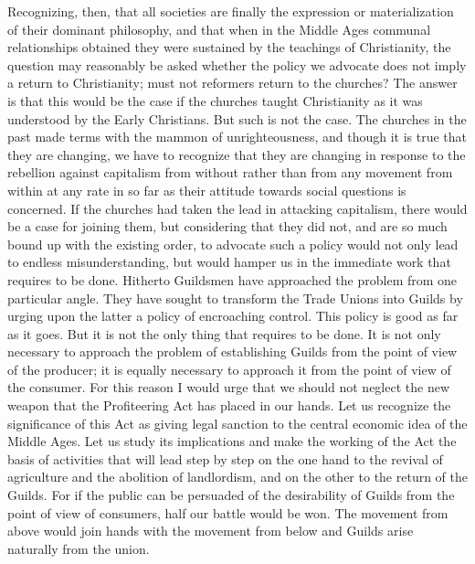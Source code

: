 \documentclass{book}
\begin{document}
Recognizing, then, that all societies are finally the expression or materialization of their dominant philosophy, and that when in the Middle Ages communal relationships obtained they were sustained by the teachings of Christianity, the question may reasonably be asked whether the policy we advocate does not imply a return to Christianity; must not reformers return to the churches? The answer is that this would be the case if the churches taught Christianity as it was understood by the Early Christians. But such is not the case. The churches in the past made terms with the mammon of unrighteousness, and though it is true that they are changing, we have to recognize that they are changing in response to the rebellion against capitalism from without rather than from any movement from within at any rate in so far as their attitude towards social questions is concerned. If the churches had taken the lead in attacking capitalism, there would be a case for joining them, but considering that they did not, and are so much bound up with the existing order, to advocate such a policy would not only lead to endless misunderstanding, but would hamper us in the immediate work that requires to be done. Hitherto Guildsmen have approached the problem from one particular angle. They have sought to transform the Trade Unions into Guilds by urging upon the latter a policy of encroaching control. This policy is good as far as it goes. But it is not the only thing that requires to be done. It is not only necessary to approach the problem of establishing Guilds from the point of view of the producer; it is equally necessary to approach it from the point of view of the consumer. For this reason I would urge that we should not neglect the new weapon that the Profiteering Act has placed in our hands. Let us recognize the significance of this Act as giving legal sanction to the central economic idea of the Middle Ages. Let us study its implications and make the working of the Act the basis of activities that will lead step by step on the one hand to the revival of agriculture and the abolition of landlordism, and on the other to the return of the Guilds. For if the public can be persuaded of the desirability of Guilds from the point of view of consumers, half our battle would be won. The movement from above would join hands with the movement from below and Guilds arise naturally from the union.
\end{document}
